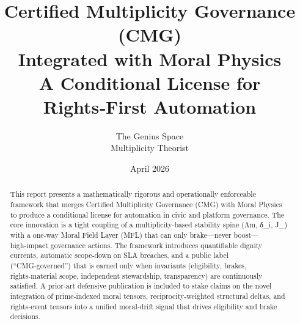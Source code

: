 \documentclass[11pt]{article}
\title{Certified Multiplicity Governance (CMG) \\ Integrated with Moral Physics \\ A Conditional License for Rights‑First Automation}
\author{The Genius Space \\ Multiplicity Theorist}
\date{April 2026}
\begin{document}
\maketitle

\begin{abstract}
This report presents a mathematically rigorous and operationally enforceable framework that merges Certified Multiplicity Governance (CMG) with Moral Physics to produce a conditional license for automation in civic and platform governance. The core innovation is a tight coupling of a multiplicity‑based stability spine (Λm, δ_i, J_{}) with a one‑way Moral Field Layer (MFL) that can only brake—never boost—high‑impact governance actions. The framework introduces quantifiable dignity currents, automatic scope‑down on SLA breaches, and a public label (“CMG‑governed”) that is earned only when invariants (eligibility, brakes, rights‑material scope, independent stewardship, transparency) are continuously satisfied. A prior‑art defensive publication is included to stake claims on the novel integration of prime‑indexed moral tensors, reciprocity‑weighted structural deltas, and rights‑event tensors into a unified moral‑drift signal that drives eligibility and brake decisions.
\end{abstract}
\end{document}

